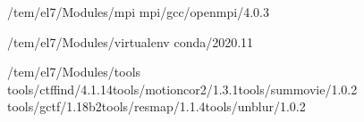 \documentclass[a4paper,11pt,english]{sphinxmanual}
\begin{document}
\begin{sphinxVerbatim}[commandchars=\\\{\}]
\PYGZhy{}\PYGZhy{}\PYGZhy{}\PYGZhy{}\PYGZhy{}\PYGZhy{}\PYGZhy{}\PYGZhy{}\PYGZhy{}\PYGZhy{}\PYGZhy{}\PYGZhy{}\PYGZhy{}\PYGZhy{}\PYGZhy{}\PYGZhy{}\PYGZhy{}\PYGZhy{}\PYGZhy{}\PYGZhy{}\PYGZhy{}\PYGZhy{}\PYGZhy{}\PYGZhy{}\PYGZhy{}\PYGZhy{}\PYGZhy{}\PYGZhy{}\PYGZhy{}\PYGZhy{}\PYGZhy{}\PYGZhy{}\PYGZhy{}\PYGZhy{}\PYGZhy{}\PYGZhy{}\PYGZhy{}\PYGZhy{}\PYGZhy{}\PYGZhy{}\PYGZhy{}\PYGZhy{}\PYGZhy{}\PYGZhy{}\PYGZhy{}\PYGZhy{}\PYGZhy{}\PYGZhy{}/tem/el7/Modules/mpi\PYGZhy{}\PYGZhy{}\PYGZhy{}\PYGZhy{}\PYGZhy{}\PYGZhy{}\PYGZhy{}\PYGZhy{}\PYGZhy{}\PYGZhy{}\PYGZhy{}\PYGZhy{}\PYGZhy{}\PYGZhy{}\PYGZhy{}\PYGZhy{}\PYGZhy{}\PYGZhy{}\PYGZhy{}\PYGZhy{}\PYGZhy{}\PYGZhy{}\PYGZhy{}\PYGZhy{}\PYGZhy{}\PYGZhy{}\PYGZhy{}\PYGZhy{}\PYGZhy{}\PYGZhy{}\PYGZhy{}\PYGZhy{}\PYGZhy{}\PYGZhy{}\PYGZhy{}\PYGZhy{}\PYGZhy{}\PYGZhy{}\PYGZhy{}\PYGZhy{}\PYGZhy{}\PYGZhy{}\PYGZhy{}\PYGZhy{}\PYGZhy{}\PYGZhy{}\PYGZhy{}\PYGZhy{}\PYGZhy{}
mpi/gcc/openmpi/4.0.3

\PYGZhy{}\PYGZhy{}\PYGZhy{}\PYGZhy{}\PYGZhy{}\PYGZhy{}\PYGZhy{}\PYGZhy{}\PYGZhy{}\PYGZhy{}\PYGZhy{}\PYGZhy{}\PYGZhy{}\PYGZhy{}\PYGZhy{}\PYGZhy{}\PYGZhy{}\PYGZhy{}\PYGZhy{}\PYGZhy{}\PYGZhy{}\PYGZhy{}\PYGZhy{}\PYGZhy{}\PYGZhy{}\PYGZhy{}\PYGZhy{}\PYGZhy{}\PYGZhy{}\PYGZhy{}\PYGZhy{}\PYGZhy{}\PYGZhy{}\PYGZhy{}\PYGZhy{}\PYGZhy{}\PYGZhy{}\PYGZhy{}\PYGZhy{}\PYGZhy{}\PYGZhy{}\PYGZhy{}\PYGZhy{}\PYGZhy{}\PYGZhy{}/tem/el7/Modules/virtualenv\PYGZhy{}\PYGZhy{}\PYGZhy{}\PYGZhy{}\PYGZhy{}\PYGZhy{}\PYGZhy{}\PYGZhy{}\PYGZhy{}\PYGZhy{}\PYGZhy{}\PYGZhy{}\PYGZhy{}\PYGZhy{}\PYGZhy{}\PYGZhy{}\PYGZhy{}\PYGZhy{}\PYGZhy{}\PYGZhy{}\PYGZhy{}\PYGZhy{}\PYGZhy{}\PYGZhy{}\PYGZhy{}\PYGZhy{}\PYGZhy{}\PYGZhy{}\PYGZhy{}\PYGZhy{}\PYGZhy{}\PYGZhy{}\PYGZhy{}\PYGZhy{}\PYGZhy{}\PYGZhy{}\PYGZhy{}\PYGZhy{}\PYGZhy{}\PYGZhy{}\PYGZhy{}\PYGZhy{}\PYGZhy{}\PYGZhy{}\PYGZhy{}
conda/2020.11

\PYGZhy{}\PYGZhy{}\PYGZhy{}\PYGZhy{}\PYGZhy{}\PYGZhy{}\PYGZhy{}\PYGZhy{}\PYGZhy{}\PYGZhy{}\PYGZhy{}\PYGZhy{}\PYGZhy{}\PYGZhy{}\PYGZhy{}\PYGZhy{}\PYGZhy{}\PYGZhy{}\PYGZhy{}\PYGZhy{}\PYGZhy{}\PYGZhy{}\PYGZhy{}\PYGZhy{}\PYGZhy{}\PYGZhy{}\PYGZhy{}\PYGZhy{}\PYGZhy{}\PYGZhy{}\PYGZhy{}\PYGZhy{}\PYGZhy{}\PYGZhy{}\PYGZhy{}\PYGZhy{}\PYGZhy{}\PYGZhy{}\PYGZhy{}\PYGZhy{}\PYGZhy{}\PYGZhy{}\PYGZhy{}\PYGZhy{}\PYGZhy{}\PYGZhy{}\PYGZhy{}/tem/el7/Modules/tools\PYGZhy{}\PYGZhy{}\PYGZhy{}\PYGZhy{}\PYGZhy{}\PYGZhy{}\PYGZhy{}\PYGZhy{}\PYGZhy{}\PYGZhy{}\PYGZhy{}\PYGZhy{}\PYGZhy{}\PYGZhy{}\PYGZhy{}\PYGZhy{}\PYGZhy{}\PYGZhy{}\PYGZhy{}\PYGZhy{}\PYGZhy{}\PYGZhy{}\PYGZhy{}\PYGZhy{}\PYGZhy{}\PYGZhy{}\PYGZhy{}\PYGZhy{}\PYGZhy{}\PYGZhy{}\PYGZhy{}\PYGZhy{}\PYGZhy{}\PYGZhy{}\PYGZhy{}\PYGZhy{}\PYGZhy{}\PYGZhy{}\PYGZhy{}\PYGZhy{}\PYGZhy{}\PYGZhy{}\PYGZhy{}\PYGZhy{}\PYGZhy{}\PYGZhy{}\PYGZhy{}\PYGZhy{}
tools/ctffind/4.1.14tools/motioncor2/1.3.1tools/summovie/1.0.2
tools/gctf/1.18\PYGZus{}b2tools/resmap/1.1.4tools/unblur/1.0.2



\end{sphinxVerbatim}
\end{document}
